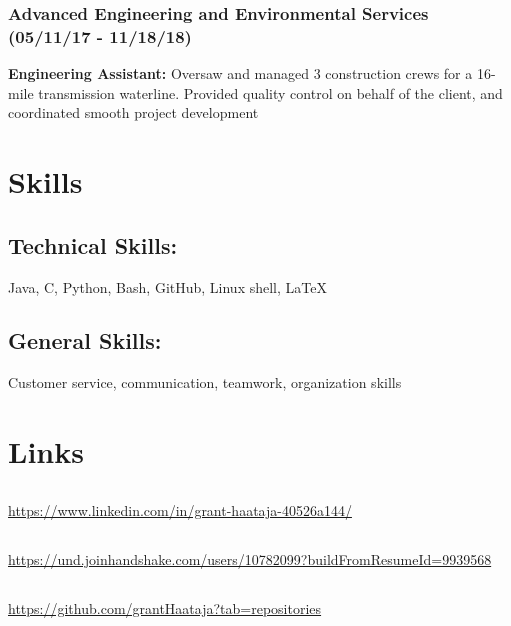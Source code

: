 \documentclass{article}
\begin{document}
\subsubsection{Advanced Engineering and Environmental Services (05/11/17 - 11/18/18)}
\textbf{Engineering Assistant:} 
Oversaw and managed 3 construction crews for a 16-mile transmission waterline. Provided quality control on behalf of the client, and coordinated smooth project development

\section{Skills}

\subsection{Technical Skills:}
Java, C, Python, Bash, GitHub, Linux shell, {\LaTeX}

\subsection{General Skills:}
Customer service, communication, teamwork, organization skills

\section{Links}

\subsection{}
\url{https://www.linkedin.com/in/grant-haataja-40526a144/}

\subsection{}
\url{https://und.joinhandshake.com/users/10782099?buildFromResumeId=9939568}

\subsection{}
\url{https://github.com/grantHaataja?tab=repositories}
\end{document}
